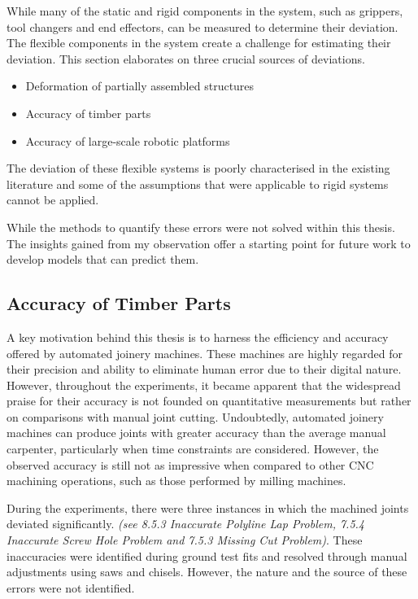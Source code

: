 While many of the static and rigid components in the system, such as grippers, tool changers and end effectors, can be measured to determine their deviation. The flexible components in the system create a challenge for estimating their deviation. This section elaborates on three crucial sources of deviations.

\begin{itemize}
	\item Deformation of partially assembled structures
	\item Accuracy of timber parts
	\item Accuracy of large-scale robotic platforms
\end{itemize}

The deviation of these flexible systems is poorly characterised in the existing literature and some of the assumptions that were applicable to rigid systems cannot be applied. 

While the methods to quantify these errors were not solved within this thesis. The insights gained from my observation offer a starting point for future work to develop models that can predict them. 

\subsection{Accuracy of Timber Parts}

A key motivation behind this thesis is to harness the efficiency and accuracy offered by automated joinery machines. These machines are highly regarded for their precision and ability to eliminate human error due to their digital nature. However, throughout the experiments, it became apparent that the widespread praise for their accuracy is not founded on quantitative measurements but rather on comparisons with manual joint cutting. Undoubtedly, automated joinery machines can produce joints with greater accuracy than the average manual carpenter, particularly when time constraints are considered. However, the observed accuracy is still not as impressive when compared to other CNC machining operations, such as those performed by milling machines.

During the experiments, there were three instances in which the machined joints deviated significantly. \textit{(see 8.5.3 Inaccurate Polyline Lap Problem, 7.5.4 Inaccurate Screw Hole Problem and 7.5.3 Missing Cut Problem)}. These inaccuracies were identified during ground test fits and resolved through manual adjustments using saws and chisels. However, the nature and the source of these errors were not identified. 

